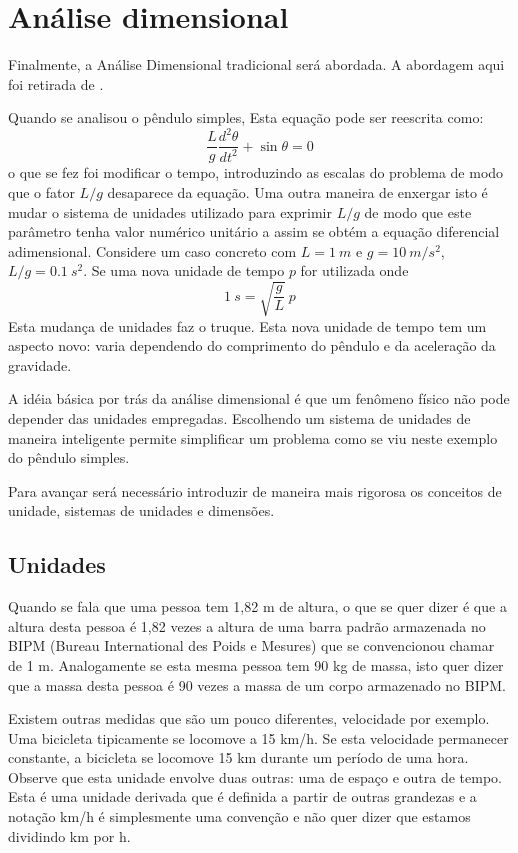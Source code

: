 \section{Análise dimensional}
\label{sec:adim}

Finalmente, a Análise Dimensional tradicional será abordada. A abordagem aqui foi retirada de . 

Quando se analisou o pêndulo simples, 
Esta equação pode ser reescrita como:
\[
\frac{L}{g}\frac{d^2\theta}{dt^2} + \sin\theta = 0 
\]
o que se fez foi modificar o tempo, introduzindo as escalas do problema de modo que o fator $L/g$ desaparece da equação. Uma outra maneira de enxergar isto é mudar o sistema de unidades utilizado para exprimir $L/g$ de modo que este parâmetro tenha valor numérico unitário a assim se obtém a equação diferencial adimensional. Considere um caso concreto com $L = 1\:m$ e $g = 10\: m/s^2$, $L/g=0.1\:s^2$. Se uma nova unidade de tempo $p$ for utilizada onde 
\[
1\:s = \sqrt{\frac{g}{L}}\:p
\] 
Esta mudança de unidades faz o truque. Esta nova unidade de tempo tem um aspecto novo: varia dependendo do comprimento do pêndulo e da aceleração da gravidade.

A idéia básica por trás da análise dimensional é que um fenômeno físico não pode depender das unidades empregadas. Escolhendo um sistema de unidades de maneira inteligente permite simplificar um problema como se viu neste exemplo do pêndulo simples.

Para avançar será necessário introduzir de maneira mais rigorosa os conceitos de unidade, sistemas de unidades e dimensões.

\subsection{Unidades}

Quando se fala que uma pessoa tem 1,82 m de altura, o que se quer dizer é que a altura desta pessoa é 1,82 vezes a altura de uma barra padrão armazenada no BIPM (Bureau International des Poids e Mesures) que se convencionou chamar de 1 m. Analogamente se esta mesma pessoa tem 90 kg de massa, isto quer dizer que a massa desta pessoa é 90 vezes a massa de um corpo armazenado no BIPM.

Existem outras medidas que são um pouco diferentes, velocidade por exemplo. Uma bicicleta tipicamente se locomove a 15 km/h. Se esta velocidade permanecer constante, a bicicleta se locomove 15 km durante um período de uma hora. Observe que esta unidade envolve duas outras: uma de espaço e outra de tempo. Esta é uma unidade derivada que é definida a partir de outras grandezas e a notação km/h é simplesmente uma convenção e não quer dizer que estamos dividindo km por h.

